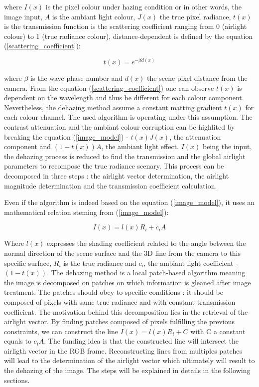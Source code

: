 \documentclass[conference]{IEEEtran}
\begin{document}
where $I(x)$ is the pixel colour under hazing condition or in other words, the image input, $A$ is the ambiant light colour,
 $J(x)$ the true pixel radiance, $t(x)$ is the transmission function is the scattering coefficient ranging from 0 (airlight colour)
  to 1 (true radiance colour), distance-dependent is defined by the equation (\ref{scattering_coefficient}):

 \begin{equation}
\label{scattering_coefficient}
t(x) = e^{-\beta d(x)}
\end{equation}

where $\beta$ is the wave phase number and $d(x)$ the scene pixel distance from the camera.  From the equation (\ref{scattering_coefficient})
one can observe $t(x)$ is dependent on the wavelength and thus be different for each colour component.  Nevertheless, the dehazing
method assume a constant matting gradient $t(x)$ for each colour channel.  The used algorithm is operating under this assumption.
The contrast attenuation and the ambiant colour corruption can be highlited by breaking the equation (\ref{image_model}) - 
$t(x) J(x)$, the attenuation component and $(1-t(x)) A$, the ambiant light effect.
$I(x)$ being the input, the dehazing process is reduced to find the transmission and the global airlight parameters to recompose
the true radiance scenary.  This process can be decomposed in three steps : the airlight vector determination, the airlight 
magnitude determination and the transmission coefficient calculation.
  
Even if the algorithm is indeed based on the equation (\ref{image_model}), it uses an mathematical relation steming from (\ref{image_model}):

 \begin{equation}
\label{shading_coefficient}
I(x) = l(x) R_i + c_i A
\end{equation}

Where $l(x)$ expresses the shading coefficient related to the angle between the normal direction of the scene surface and 
the 3D line from the camera to this specific surface, $R_i$ is the true radiance and $c_i$, the ambiant light coefficient - $(1-t(x))$.
The dehazing method is a local patch-based algorithm meaning the image is decomposed on patches on which information is
gleaned after image treatment.  The patches should obey to specific conditions : it should be composed of pixels with same
 true radiance and with constant transmission coefficient. The motivation behind this decomposition lies in the retrieval of the airlight
vector.  By finding patches composed of pixels fulfilling the previous constraints, we can construct the line $I(x) = l(x) R_i + C$ 
with C a constant equals to $c_i A$. The funding idea is that the constructed line will intersect the airligth vector in the RGB frame.
Reconstructing lines from multiples patches will lead to the determination of the airlight vector which ultimately will result to
the dehazing of the image.  The steps will be explained in details in the following sections.
\end{document}
